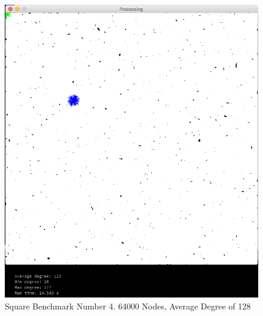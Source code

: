 \documentclass{article}
\begin{document}
\begin{center}
    \begin{figure}
        \includegraphics[scale=0.45]{./images/square_4.png}
        \caption{Square Benchmark Number 4. 64000 Nodes, Average Degree of 128}
        \label{square4}
    \end{figure}
\end{center}
\end{document}
